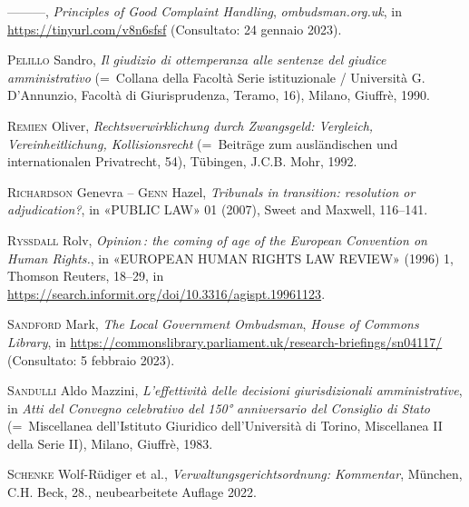 \documentclass[12pt,it,a4paper,]{report}
\newlength{\cslhangindent}
\newenvironment{CSLReferences}[2] %
 {%
  \setlength{\parindent}{0pt}
  \ifodd #1 \everypar{\setlength{\hangindent}{\cslhangindent}}\ignorespaces\fi
  \ifnum #2 > 0
  \setlength{\parskip}{#2\baselineskip}
  \fi
 }%
 {}
\begin{document}
\begin{CSLReferences}{1}{0}
\leavevmode{}%
---------, \emph{Principles of Good Complaint Handling},
\emph{ombudsman.org.uk}, in \url{https://tinyurl.com/v8n6sfsf}
(Consultato: 24 gennaio 2023).

\leavevmode{}%
\textsc{Pelillo} Sandro, \emph{Il giudizio di ottemperanza alle sentenze
del giudice amministrativo} (=~Collana della Facoltà Serie istituzionale
/ Università G. D'Annunzio, Facoltà di Giurisprudenza, Teramo, 16),
Milano, Giuffrè, 1990.

\leavevmode{}%
\textsc{Remien} Oliver, \emph{Rechtsverwirklichung durch Zwangsgeld:
Vergleich, Vereinheitlichung, Kollisionsrecht} (=~Beiträge zum
ausländischen und internationalen Privatrecht, 54), Tübingen, J.C.B.
Mohr, 1992.

\leavevmode{}%
\textsc{Richardson} Genevra -- \textsc{Genn} Hazel, \emph{Tribunals in
transition: resolution or adjudication?}, in {«PUBLIC LAW»} 01 (2007),
Sweet and Maxwell, 116--141.

\leavevmode{}%
\textsc{Ryssdall} Rolv, \emph{Opinion\,: the coming of age of the
European Convention on Human Rights.}, in {«EUROPEAN HUMAN RIGHTS LAW
REVIEW»} (1996) 1, Thomson Reuters, 18--29, in
\url{https://search.informit.org/doi/10.3316/agispt.19961123}.

\leavevmode{}%
\textsc{Sandford} Mark, \emph{The Local Government Ombudsman},
\emph{House of Commons Library}, in
\url{https://commonslibrary.parliament.uk/research-briefings/sn04117/}
(Consultato: 5 febbraio 2023).

\leavevmode{}%
\textsc{Sandulli} Aldo Mazzini, \emph{L'effettività delle decisioni
giurisdizionali amministrative}, in \emph{Atti del Convegno celebrativo
del 150° anniversario del Consiglio di Stato} (=~Miscellanea
dell'Istituto Giuridico dell'Università di Torino, Miscellanea II della
Serie II), Milano, Giuffrè, 1983.

\leavevmode{}%
\textsc{Schenke} Wolf-Rüdiger et al., \emph{Verwaltungsgerichtsordnung:
Kommentar}, München, C.H. Beck, 28., neubearbeitete Auflage 2022.


\end{CSLReferences}
\end{document}
